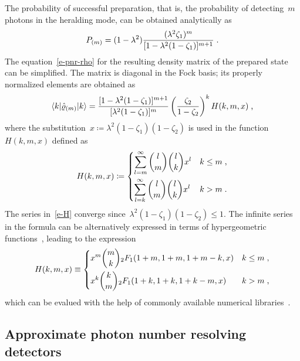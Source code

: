 \documentclass{article}
\begin{document}
The probability of successful preparation, that is, the probability of detecting~$m$ photons in the heralding mode, can be obtained analytically as
%
\begin{equation}\label{e-pnr-pro}
  P_{(m)} = (1 - \lambda^{2}) 
  \frac
    { (\lambda^{2} \zeta_{1})^{m} }
    { [ 1 - \lambda^{2} (1 - \zeta_{1}) ]^{m + 1} } \;\text{.}
\end{equation}
%
The equation~\eqref{e-pnr-rho} for the resulting density matrix of the prepared state can be simplified. The matrix is diagonal in the Fock basis; its properly normalized elements are obtained as
%
\begin{equation}\label{e-pnr-rho-kk}
  \braket{ k | \hat{\varrho}_{(m)} | k } =
  \frac
    { [ 1 - \lambda^{2} (1 - \zeta_{1}) ]^{m + 1} }
    { [ \lambda^{2} (1 - \zeta_{1}) ]^{m} }
  \left( \frac{ \zeta_{2} }{ 1 - \zeta_{2} } \right)^{k}
  H (k, m, x) \;\text{,}
\end{equation}
%
where the substitution~${x \coloneqq \lambda^{2} ( 1 - \zeta_{1} )(1 - \zeta_{2} )}$ is used in the function~$H(k, m, x)$ defined as
%
\begin{equation}\label{e-H}
  H(k, m, x) \coloneq
  \begin{dcases}
    \sum_{l = m}^{\infty}
      \binom{l}{m}
      \binom{l}{k}
      x^{l} 
    & k \leq m \;\text{,} \\
    \sum_{l = k}^{\infty}
      \binom{l}{m}
      \binom{l}{k}
      x^{l}
    & k > m \;\text{.}
  \end{dcases}
\end{equation}
%
The series in~\eqref{e-H} converge since~${\lambda^{2} ( 1 - \zeta_{1} )(1 - \zeta_{2} ) \leq 1}$. The infinite series in the formula can be alternatively expressed in terms of hypergeometric functions~\cite{bateman1981}, leading to the expression
%
\begin{equation}
  H(k, m, x) \equiv
  \begin{dcases}
    x^{m} \binom{m}{k} {}_{2}F_{1} (1 + m, 1 + m, 1 + m - k, x)
    & k \leq m \;\text{,} \\
    x^{k} \binom{k}{m} {}_{2}F_{1} (1 + k, 1 + k, 1 + k - m, x)
    & k > m \;\text{,}
  \end{dcases}
\end{equation}
%
which can be evalued with the help of commonly available numerical libraries~\cite{virtanen2020}.

\subsection*{Approximate photon number resolving detectors}
\end{document}
